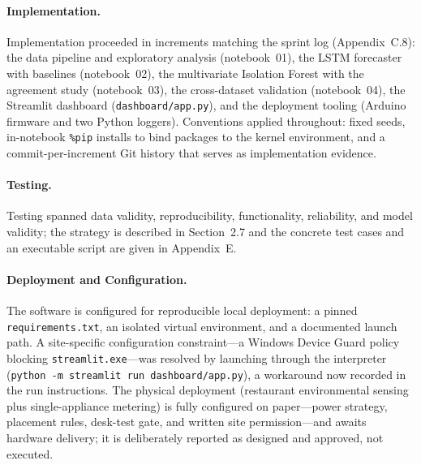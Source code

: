 \documentclass[11pt,a4paper]{article}
\begin{document}
\paragraph{Implementation.}
Implementation proceeded in increments matching the sprint log (Appendix~C.8):
the data pipeline and exploratory analysis (notebook~01), the LSTM forecaster
with baselines (notebook~02), the multivariate Isolation Forest with the
agreement study (notebook~03), the cross-dataset validation (notebook~04), the
Streamlit dashboard (\texttt{dashboard/app.py}), and the deployment tooling
(Arduino firmware and two Python loggers). Conventions applied throughout: fixed
seeds, in-notebook \texttt{\%pip} installs to bind packages to the kernel
environment, and a commit-per-increment Git history that serves as
implementation evidence.

\paragraph{Testing.}
Testing spanned data validity, reproducibility, functionality, reliability, and
model validity; the strategy is described in Section~2.7 and the concrete test
cases and an executable script are given in Appendix~E.

\paragraph{Deployment and Configuration.}
The software is configured for reproducible local deployment: a pinned
\texttt{requirements.txt}, an isolated virtual environment, and a documented
launch path. A site-specific configuration constraint---a Windows Device Guard
policy blocking \texttt{streamlit.exe}---was resolved by launching through the
interpreter (\texttt{python -m streamlit run dashboard/app.py}), a workaround
now recorded in the run instructions. The physical deployment (restaurant
environmental sensing plus single-appliance metering) is fully configured on
paper---power strategy, placement rules, desk-test gate, and written site
permission---and awaits hardware delivery; it is deliberately reported as
designed and approved, not executed.
\end{document}
